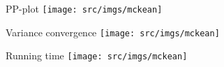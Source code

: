 \begin{frame}{PP-plot}\centering
  \texttt{[image: src/imgs/mckean]}
\end{frame}


\begin{frame}{Variance convergence}\centering
  \texttt{[image: src/imgs/mckean]}
\end{frame}


\begin{frame}{Running time}\centering
  \texttt{[image: src/imgs/mckean]}
\end{frame}






